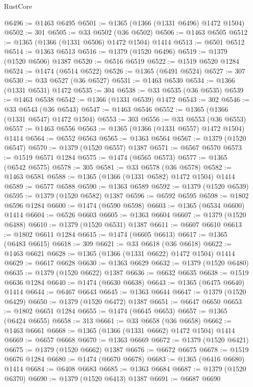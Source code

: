 \begin{lexlean}{RustCore}
\begin{coremodule}
@6496 := @1463 @6495
@6501 := @1365 (@1366 (@1331 @6496) @1472 @1504)
@6502 := 301
@6505 := @33 @6502 (@36 @6502)
@6506 := @1463 @6505
@6512 := @1365 (@1366 (@1331 @6506) @1472 @1504) @1414
@6513 := @6501 @6512
@6514 := @1363 @6513
@6516 := @1379 (@1520 @6496)
@6519 := @1379 (@1520 @6506) @1387
@6520 := @6516 @6519
@6522 := @1519 @6520 @1284
@6524 := @1474 (@6514 @6522)
@6526 := @1365 (@6491 @6524)
@6527 := 307
@6530 := @33 @6527 (@36 @6527)
@6531 := @1463 @6530
@6534 := @1366 (@1331 @6531) @1472
@6535 := 304
@6538 := @33 @6535 (@36 @6535)
@6539 := @1463 @6538
@6542 := @1366 (@1331 @6539) @1472
@6543 := 302
@6546 := @33 @6543 (@36 @6543)
@6547 := @1463 @6546
@6552 := @1365 (@1366 (@1331 @6547) @1472 @1504)
@6553 := 303
@6556 := @33 @6553 (@36 @6553)
@6557 := @1463 @6556
@6563 := @1365 (@1366 (@1331 @6557) @1472 @1504) @1414
@6564 := @6552 @6563
@6565 := @1363 @6564
@6567 := @1379 (@1520 @6547)
@6570 := @1379 (@1520 @6557) @1387
@6571 := @6567 @6570
@6573 := @1519 @6571 @1284
@6575 := @1474 (@6565 @6573)
@6577 := @1365 (@6542 @6575)
@6578 := 305
@6581 := @33 @6578 (@36 @6578)
@6582 := @1463 @6581
@6588 := @1365 (@1366 (@1331 @6582) @1472 @1504) @1414
@6589 := @6577 @6588
@6590 := @1363 @6589
@6592 := @1379 (@1520 @6539)
@6595 := @1379 (@1520 @6582) @1387
@6596 := @6592 @6595
@6598 := @1802 @6596 @1284
@6600 := @1474 (@6590 @6598)
@6603 := @1365 (@6534 @6600) @1414
@6604 := @6526 @6603
@6605 := @1363 @6604
@6607 := @1379 (@1520 @6488)
@6610 := @1379 (@1520 @6531) @1387
@6611 := @6607 @6610
@6613 := @1802 @6611 @1284
@6615 := @1474 (@6605 @6613)
@6617 := @1365 (@6483 @6615)
@6618 := 309
@6621 := @33 @6618 (@36 @6618)
@6622 := @1463 @6621
@6628 := @1365 (@1366 (@1331 @6622) @1472 @1504) @1414
@6629 := @6617 @6628
@6630 := @1363 @6629
@6632 := @1379 (@1520 @6480)
@6635 := @1379 (@1520 @6622) @1387
@6636 := @6632 @6635
@6638 := @1519 @6636 @1284
@6640 := @1474 (@6630 @6638)
@6643 := @1365 (@6475 @6640) @1414
@6644 := @6467 @6643
@6645 := @1363 @6644
@6647 := @1379 (@1520 @6429)
@6650 := @1379 (@1520 @6472) @1387
@6651 := @6647 @6650
@6653 := @1802 @6651 @1284
@6655 := @1474 (@6645 @6653)
@6657 := @1365 (@6424 @6655)
@6658 := 313
@6661 := @33 @6658 (@36 @6658)
@6662 := @1463 @6661
@6668 := @1365 (@1366 (@1331 @6662) @1472 @1504) @1414
@6669 := @6657 @6668
@6670 := @1363 @6669
@6672 := @1379 (@1520 @6421)
@6675 := @1379 (@1520 @6662) @1387
@6676 := @6672 @6675
@6678 := @1519 @6676 @1284
@6680 := @1474 (@6670 @6678)
@6683 := @1365 (@6416 @6680) @1414
@6684 := @6408 @6683
@6685 := @1363 @6684
@6687 := @1379 (@1520 @6370)
@6690 := @1379 (@1520 @6413) @1387
@6691 := @6687 @6690

\end{coremodule}
\end{lexlean}
